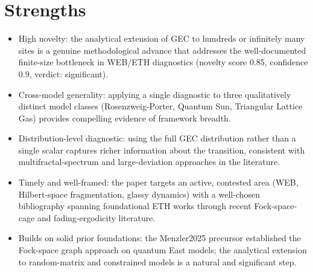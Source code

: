 \documentclass[11pt]{article}
\begin{document}
\section*{Strengths}
\begin{itemize}[leftmargin=*]
  \item High novelty: the analytical extension of GEC to hundreds or infinitely many sites is a genuine methodological advance that addresses the well-documented finite-size bottleneck in WEB/ETH diagnostics (novelty score 0.85, confidence 0.9, verdict: significant).
  \item Cross-model generality: applying a single diagnostic to three qualitatively distinct model classes (Rosenzweig-Porter, Quantum Sun, Triangular Lattice Gas) provides compelling evidence of framework breadth.
  \item Distribution-level diagnostic: using the full GEC distribution rather than a single scalar captures richer information about the transition, consistent with multifractal-spectrum and large-deviation approaches in the literature.
  \item Timely and well-framed: the paper targets an active, contested area (WEB, Hilbert-space fragmentation, glassy dynamics) with a well-chosen bibliography spanning foundational ETH works through recent Fock-space-cage and fading-ergodicity literature.
  \item Builds on solid prior foundations: the Menzler2025 precursor established the Fock-space graph approach on quantum East models; the analytical extension to random-matrix and constrained models is a natural and significant step.
\end{itemize}
\end{document}
